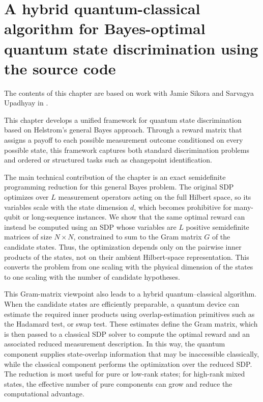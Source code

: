 \chapter{A hybrid quantum-classical algorithm for Bayes-optimal quantum state discrimination using the source code}\label{ch:QSD}

The contents of this chapter are based on work with Jamie Sikora and Sarvagya Upadhyay in \cite{mohan2026hybridquantumclassicalalgorithmbayesoptimal}.

This chapter develops a unified framework for quantum state discrimination based on Helstrom’s general Bayes approach. 
Through a reward matrix that assigns a payoff to each possible measurement outcome conditioned on every possible state, this framework captures both standard discrimination problems and ordered or structured tasks such as changepoint identification. 

The main technical contribution of the chapter is an exact semidefinite programming reduction for this general Bayes problem. 
The original SDP optimizes over $L$ measurement operators acting on the full Hilbert space, so its variables scale with the state dimension $d$, which becomes prohibitive for many-qubit or long-sequence instances. 
We show that the same optimal reward can instead be computed using an SDP whose variables are $L$ positive semidefinite matrices of size $N \times N$, constrained to sum to the Gram matrix $G$ of the candidate states. 
Thus, the optimization depends only on the pairwise inner products of the states, not on their ambient Hilbert-space representation. 
This converts the problem from one scaling with the physical dimension of the states to one scaling with the number of candidate hypotheses. 

This Gram-matrix viewpoint also leads to a hybrid quantum–classical algorithm. 
When the candidate states are efficiently preparable, a quantum device can estimate the required inner products using overlap-estimation primitives such as the Hadamard test, or swap test. 
These estimates define the Gram matrix, which is then passed to a classical SDP solver to compute the optimal reward and an associated reduced measurement description. 
In this way, the quantum component supplies state-overlap information that may be inaccessible classically, while the classical component performs the optimization over the reduced SDP. 
The reduction is most useful for pure or low-rank states; for high-rank mixed states, the effective number of pure components can grow and reduce the computational advantage. 

